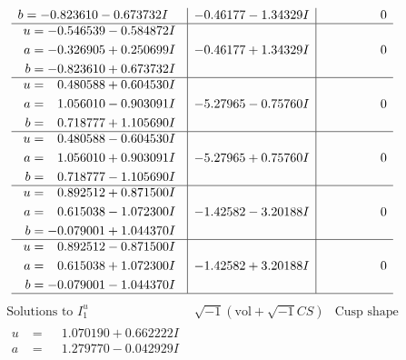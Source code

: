 \documentclass[1p]{elsarticle_modified}
\theoremstyle{definition}
\newcommand{\I}{\sqrt{-1}}
\begin{document}
$$\begin{array}{c|c|c}
\begin{aligned}
b &= -0.823610 - 0.673732 I\end{aligned}
 & -0.46177 - 1.34329 I & \phantom{-0.000000 } 0 \\ \hline\begin{aligned}
u &= -0.546539 - 0.584872 I \\
a &= -0.326905 + 0.250699 I \\
b &= -0.823610 + 0.673732 I\end{aligned}
 & -0.46177 + 1.34329 I & \phantom{-0.000000 } 0 \\ \hline\begin{aligned}
u &= \phantom{-}0.480588 + 0.604530 I \\
a &= \phantom{-}1.056010 - 0.903091 I \\
b &= \phantom{-}0.718777 + 1.105690 I\end{aligned}
 & -5.27965 - 0.75760 I & \phantom{-0.000000 } 0 \\ \hline\begin{aligned}
u &= \phantom{-}0.480588 - 0.604530 I \\
a &= \phantom{-}1.056010 + 0.903091 I \\
b &= \phantom{-}0.718777 - 1.105690 I\end{aligned}
 & -5.27965 + 0.75760 I & \phantom{-0.000000 } 0 \\ \hline\begin{aligned}
u &= \phantom{-}0.892512 + 0.871500 I \\
a &= \phantom{-}0.615038 - 1.072300 I \\
b &= -0.079001 + 1.044370 I\end{aligned}
 & -1.42582 - 3.20188 I & \phantom{-0.000000 } 0 \\ \hline\begin{aligned}
u &= \phantom{-}0.892512 - 0.871500 I \\
a &= \phantom{-}0.615038 + 1.072300 I \\
b &= -0.079001 - 1.044370 I\end{aligned}
 & -1.42582 + 3.20188 I & \phantom{-0.000000 } 0\\
 \hline 
 \end{array}$$\newpage$$\begin{array}{c|c|c}  
\text{Solutions to }I^u_{1}& \I (\text{vol} + \sqrt{-1}CS) & \text{Cusp shape}\\
 \hline 
\begin{aligned}
u &= \phantom{-}1.070190 + 0.662222 I \\
a &= \phantom{-}1.279770 - 0.042929 I \\

\end{aligned}
\end{array}$$
\end{document}
